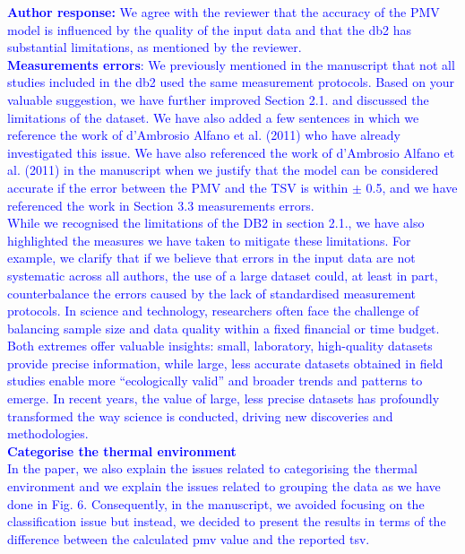 \documentclass[a4paper, 10pt]{letter}
\newcommand{\response}[1]{\textcolor{blue}{\textbf{Author response:} #1}}
\begin{document}
\begin{letter}
\begin{enumerate}
            \response{
                We agree with the reviewer that the accuracy of the PMV model is influenced by the quality of the input data and that the \ac{db2} has substantial limitations, as mentioned by the reviewer.\\
                \textbf{Measurements errors}:
                We previously mentioned in the manuscript that not all studies included in the \ac{db2} used the same measurement protocols. 
                Based on your valuable suggestion, we have further improved Section 2.1. and discussed the limitations of the dataset.
                We have also added a few sentences in which we reference the work of d’Ambrosio Alfano et al. (2011) who have already investigated this issue.
                We have also referenced the work of d’Ambrosio Alfano et al. (2011) in the manuscript when we justify that the model can be considered accurate if the error between the PMV and the TSV is within $\pm$ 0.5, and we have referenced the work in Section 3.3 measurements errors.\\
                While we recognised the limitations of the DB2 in section 2.1., we have also highlighted the measures we have taken to mitigate these limitations.
                For example, we clarify that if we believe that errors in the input data are not systematic across all authors, the use of a large dataset could, at least in part, counterbalance the errors caused by the lack of standardised measurement protocols.
                In science and technology, researchers often face the challenge of balancing sample size and data quality within a fixed financial or time budget. 
                Both extremes offer valuable insights: small, laboratory, high-quality datasets provide precise information, while large, less accurate datasets obtained in field studies enable more ``ecologically valid'' and broader trends and patterns to emerge.
                In recent years, the value of large, less precise datasets has profoundly transformed the way science is conducted, driving new discoveries and methodologies.\\
                \textbf{Categorise the thermal environment}\\
                In the paper, we also explain the issues related to categorising the thermal environment and we explain the issues related to grouping the data as we have done in Fig. 6.
                Consequently, in the manuscript, we avoided focusing on the classification issue but instead, we decided to present the results in terms of the difference between the calculated \ac{pmv} value and the reported \ac{tsv}.
            }


\end{enumerate}
\end{letter}
\end{document}

